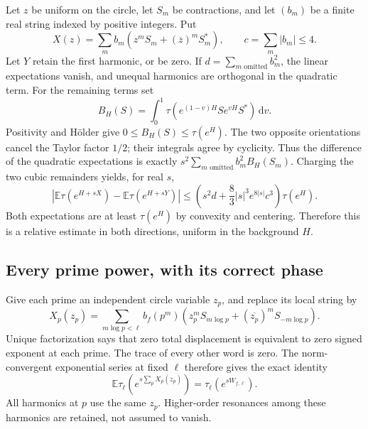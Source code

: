 \documentclass[11pt,reqno]{amsart}
\numberwithin{equation}{section}
\newcommand{\E}{\mathbb E}
\newcommand{\dd}{\,\mathrm d}
\newcommand{\abs}[1]{\lvert#1\rvert}
\begin{document}
Let $z$ be uniform on the circle, let $S_m$ be contractions, and
let $(b_m)$ be a finite real string indexed by positive integers. Put
\[
 X(z)=\sum_m b_m(z^mS_m+(\overline z)^mS_m^*),
 \qquad c=\sum_m\abs{b_m}\le4.
\]
Let $Y$ retain the first harmonic, or be zero. If
$d=\sum_{m\text{ omitted}}b_m^2$, the linear expectations vanish,
and unequal harmonics are orthogonal in the quadratic term.
For the remaining terms set
\[
 B_H(S)=\int_0^1\tau(e^{(1-v)H}S e^{vH}S^*)\dd v.
\]
Positivity and H\"older give $0\le B_H(S)\le\tau(e^H)$.
The two opposite orientations cancel the Taylor factor $1/2$;
their integrals agree by cyclicity. Thus the difference of the
quadratic expectations is exactly
$s^2\sum_{m\text{ omitted}}b_m^2B_H(S_m)$.
Charging the two cubic remainders yields, for real $s$,
\begin{equation}\label{eq:local-relative}
 \left|\E\tau(e^{H+sX})-\E\tau(e^{H+sY})\right|
 \le\left(s^2d+\frac83\abs s^3e^{8\abs s}c^3\right)\tau(e^H).
\end{equation}
Both expectations are at least $\tau(e^H)$ by convexity and
centering. Therefore this is a relative estimate in both directions,
uniform in the background $H$.

\subsection*{Every prime power, with its correct phase}

Give each prime an independent circle variable $z_p$, and replace
its local string by
\[
 X_p(z_p)=\sum_{m\log p<\ell}b_f(p^m)
       (z_p^mS_{m\log p}+(\overline{z_p})^mS_{-m\log p}).
\]
Unique factorization says that zero total displacement is equivalent
to zero signed exponent at each prime. The trace of every other
word is zero. The norm-convergent exponential series at fixed
$\ell$ therefore gives the exact identity
\begin{equation}\label{eq:phase-identity}
 \E\tau_\ell\left(e^{s\sum_pX_p(z_p)}\right)
       =\tau_\ell(e^{sW_{f,\ell}}).
\end{equation}
All harmonics at $p$ use the same $z_p$. Higher-order resonances
among these harmonics are retained, not assumed to vanish.
\end{document}
